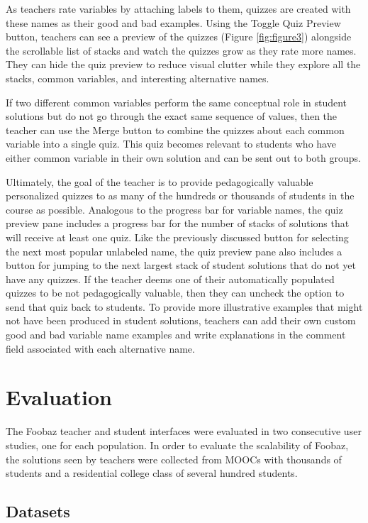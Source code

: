 As teachers rate variables by attaching labels to them, quizzes are created with these names as their good and bad examples. Using the Toggle Quiz Preview button, teachers can see a preview of the quizzes (Figure \ref{fig:figure3}) alongside the scrollable list of stacks and watch the quizzes grow as they rate more names. They can hide the quiz preview to reduce visual clutter while they explore all the stacks, common variables, and interesting alternative names.

If two different common variables perform the same conceptual role in student solutions but do not go through the exact same sequence of values, then the teacher can use the Merge button to combine the quizzes about each common variable into a single quiz. This quiz becomes relevant to students who have either common variable in their own solution and can be sent out to both groups.

Ultimately, the goal of the teacher is to provide pedagogically valuable personalized quizzes to as many of the hundreds or thousands of students in the course as possible. Analogous to the progress bar for variable names, the quiz preview pane includes a progress bar for the number of stacks of solutions that will receive at least one quiz. Like the previously discussed button for selecting the next most popular unlabeled name, the quiz preview pane also includes a button for jumping to the next largest stack of student solutions that do not yet have any quizzes. If the teacher deems one of their automatically populated quizzes to be not pedagogically valuable, then they can uncheck the option to send that quiz back to students. To provide more illustrative examples that might not have been produced in student solutions, teachers can add their own custom good and bad variable name examples and write explanations in the comment field associated with each alternative name.

\section{Evaluation}

The Foobaz teacher and student interfaces were evaluated in two consecutive user studies, one for each population. In order to evaluate the scalability of Foobaz, the solutions seen by teachers were collected from MOOCs with thousands of students and a residential college class of several hundred students.

\subsection{Datasets}

